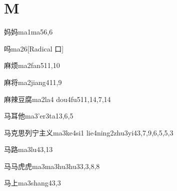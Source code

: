 
\section*{M}

\begin{verbete}{妈妈}{ma1ma5}{6,6}
\end{verbete}

\begin{verbete}{吗}{ma2}{6}[Radical 口]
\end{verbete}

\begin{verbete}{麻烦}{ma2fan5}{11,10}
\end{verbete}

\begin{verbete}{麻将}{ma2jiang4}{11,9}
\end{verbete}

\begin{verbete}{麻辣豆腐}{ma2la4 dou4fu5}{11,14,7,14}
\end{verbete}

\begin{verbete}{马耳他}{ma3'er3ta1}{3,6,5}
\end{verbete}

\begin{verbete}{马克思列宁主义}{ma3ke4si1 lie4ning2zhu3yi4}{3,7,9,6,5,5,3}
\end{verbete}

\begin{verbete}{马路}{ma3lu4}{3,13}
\end{verbete}

\begin{verbete}{马马虎虎}{ma3ma3hu3hu3}{3,3,8,8}
\end{verbete}

\begin{verbete}{马上}{ma3shang4}{3,3}
\end{verbete}

